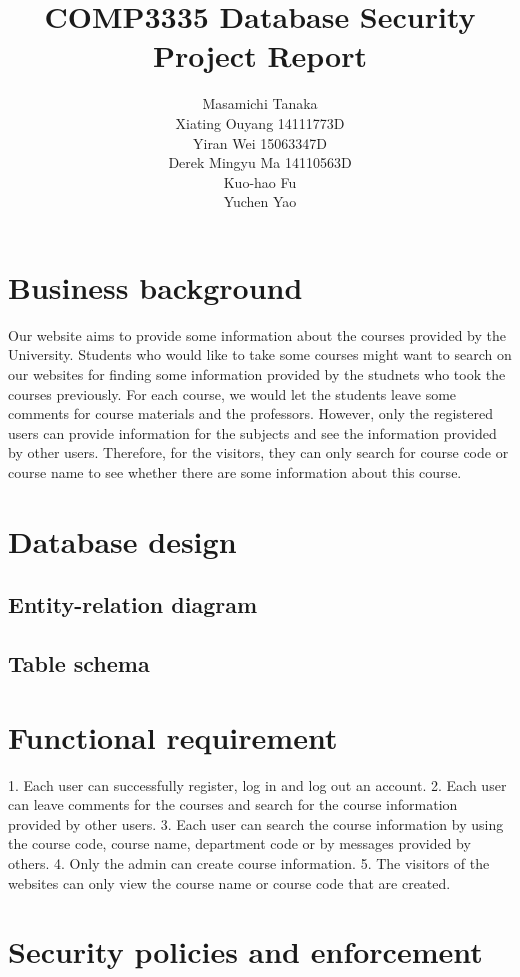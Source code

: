 \documentclass[a4paper,11pt]{article}
\title{\vspace{6cm} COMP3335 Database Security Project Report}
\author{Masamichi Tanaka \\
		Xiating Ouyang  14111773D \\
		Yiran Wei 15063347D  \\
		Derek Mingyu Ma 14110563D \\
		Kuo-hao Fu \\
		Yuchen Yao 
}
\date{}
\theoremstyle{plain} %
\begin{document}
\maketitle	
\newpage
\tableofcontents
\newpage

\section{Business background}
	Our website aims to provide some information about the courses provided by the University. Students who would like to take some courses might want to search on our websites for finding some information provided by the studnets who took the courses previously. For each course, we would let the students leave some comments for course materials and the professors. However, only the registered users can provide information for the subjects and see the information provided by other users. Therefore, for the visitors, they can only search for course code or course name to see whether there are some information about this course.

\section{Database design}

\subsection{Entity-relation diagram}

\subsection{Table schema}

\section{Functional requirement}
	1. Each user can successfully register, log in and log out an account.
	2. Each user can leave comments for the courses and search for the course information provided by other users.
	3. Each user can search the course information by using the course code, course name, department code or by messages provided by others. 
	4. Only the admin can create course information.
	5. The visitors of the websites can only view the course name or course code that are created. 

\section{Security policies and enforcement}
\end{document}
